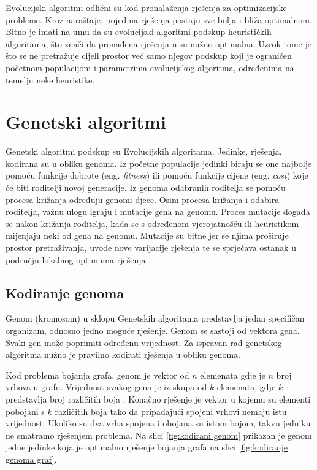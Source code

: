 \documentclass[times, utf8, zavrsni, numeric]{fer}
\begin{document}
Evolucijski algoritmi odlični su kod pronalaženja rješenja za optimizacijske probleme. Kroz naraštaje, pojedina rješenja postaju sve bolja i bliža optimalnom. Bitno je imati na umu da su evolucijski algoritmi podskup heurističkih algoritama, što znači da pronađena rješenja nisu nužno optimalna. Uzrok tome je što se ne pretražuje cijeli prostor već samo njegov podskup koji je ograničen početnom populacijom i parametrima evolucijskog algoritma, određenima na temelju neke heuristike.

\section{Genetski algoritmi}
Genetski algoritmi podskup su Evolucijskih algoritama. Jedinke, rješenja, kodirana su u obliku genoma. Iz početne populacije jedinki biraju se one najbolje pomoću funkcije dobrote (eng. \textit{fitness}) ili pomoću funkcije cijene (eng. \textit{cost}) koje će biti roditelji novoj generacije. Iz genoma odabranih roditelja se pomoću procesa križanja određuju genomi djece. Osim procesa križanja i odabira roditelja, važnu ulogu igraju i mutacije gena na genomu. Proces mutacije događa se nakon križanja roditelja, kada se s određenom vjerojatnošću ili heuristikom mijenjaju neki od gena na genomu. Mutacije su bitne jer se njima proširuje prostor pretraživanja, uvode nove varijacije rješenja te se sprječava ostanak u području lokalnog optimuma rješenja \cite{cupic2010prirodom}.

\subsection{Kodiranje genoma}
Genom (kromosom) u sklopu Genetskih algoritama predstavlja jedan specifičan organizam, odnosno jedno moguće rješenje. Genom se sastoji od vektora gena. Svaki gen može poprimiti određenu vrijednost. Za ispravan rad genetskog algoritma nužno je pravilno kodirati rješenja u obliku genoma.

Kod problema bojanja grafa, genom je vektor od $n$ elemenata gdje je $n$ broj vrhova u grafu. Vrijednost svakog gena je iz skupa od $k$ elemenata, gdje $k$ predstavlja broj različitih boja \cite{marappan2013new}. Konačno rješenje je vektor u kojemu su elementi pobojani s $k$ različitih boja tako da pripadajući spojeni vrhovi nemaju istu vrijednost. Ukoliko su dva vrha spojena i obojana su istom bojom, takvu jedniku ne smatramo rješenjem problema. Na slici \ref{fig:kodirani genom} prikazan je genom jedne jedinke koja je optimalno rješenje bojanja grafa na slici \ref{fig:kodiranje genoma graf}.
\end{document}
